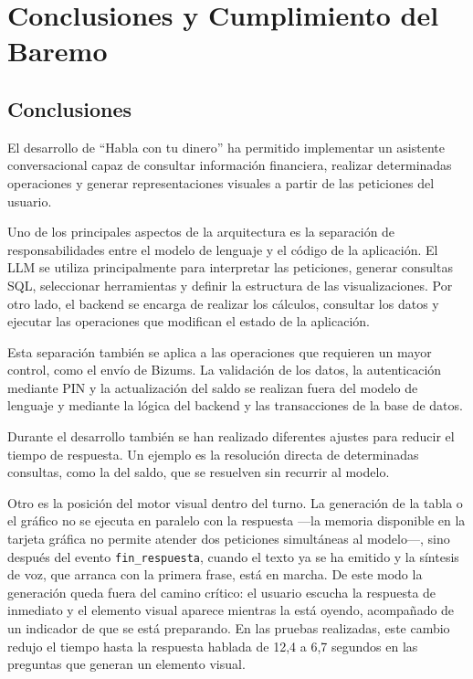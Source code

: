 \section{Conclusiones y Cumplimiento del Baremo}

\subsection{Conclusiones}

El desarrollo de ``Habla con tu dinero'' ha permitido implementar un asistente
conversacional capaz de consultar información financiera, realizar determinadas
operaciones y generar representaciones visuales a partir de las peticiones del
usuario.

Uno de los principales aspectos de la arquitectura es la separación de
responsabilidades entre el modelo de lenguaje y el código de la aplicación. El
LLM se utiliza principalmente para interpretar las peticiones, generar
consultas SQL, seleccionar herramientas y definir la estructura de las
visualizaciones. Por otro lado, el backend se encarga de realizar los cálculos,
consultar los datos y ejecutar las operaciones que modifican el estado de la
aplicación.

Esta separación también se aplica a las operaciones que requieren un mayor
control, como el envío de Bizums. La validación de los datos, la autenticación
mediante PIN y la actualización del saldo se realizan fuera del modelo de
lenguaje y mediante la lógica del backend y las transacciones de la base de
datos.

Durante el desarrollo también se han realizado diferentes ajustes para reducir
el tiempo de respuesta. Un ejemplo es la resolución directa de determinadas
consultas, como la del saldo, que se resuelven sin recurrir al modelo.

Otro es la posición del motor visual dentro del turno. La generación de la
tabla o el gráfico no se ejecuta en paralelo con la respuesta —la memoria
disponible en la tarjeta gráfica no permite atender dos peticiones simultáneas
al modelo—, sino después del evento \texttt{fin\_respuesta}, cuando el texto
ya se ha emitido y la síntesis de voz, que arranca con la primera frase, está en
marcha. De este modo la generación queda fuera del camino crítico: el usuario escucha la respuesta de inmediato y el elemento visual
aparece mientras la está oyendo, acompañado de un indicador de que se está
preparando. En las pruebas realizadas, este cambio redujo el tiempo hasta la
respuesta hablada de 12,4 a 6,7 segundos en las preguntas que generan un
elemento visual.

